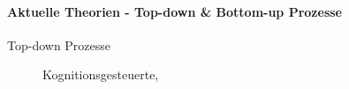 \paragraph{Aktuelle Theorien - Top-down \& Bottom-up Prozesse}
\begin{description}
  \item[Top-down Prozesse] Kognitionsgesteuerte,
\end{description}
